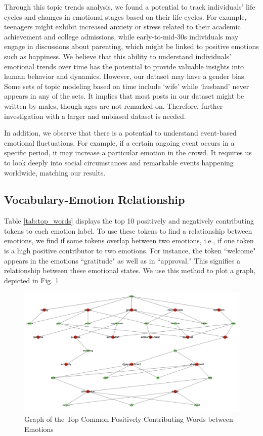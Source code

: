 \documentclass[conference,compsoc]{IEEEtran}
\begin{document}
Through this topic trends analysis, we found a potential to track individuals' life cycles and changes in emotional stages based on their life cycles. For example, teenagers might exhibit increased anxiety or stress related to their academic achievement and college admissions, while early-to-mid-30s individuals may engage in discussions about parenting, which might be linked to positive emotions such as happiness. We believe that this ability to understand individuals' emotional trends over time has the potential to provide valuable insights into human behavior and dynamics. However, our dataset may have a gender bias. Some sets of topic modeling based on time include `wife' while `husband' never appears in any of the sets. It implies that most posts in our dataset might be written by males, though ages are not remarked on. Therefore, further investigation with a larger and unbiased dataset is needed.

In addition, we observe that there is a potential to understand event-based emotional fluctuations. For example, if a certain ongoing event occurs in a specific period, it may increase a particular emotion in the crowd. It requires us to look deeply into social circumstances and remarkable events happening worldwide, matching our results. 


\subsection{Vocabulary-Emotion Relationship}

Table \ref{tab:top_words} displays the top 10 positively and negatively contributing tokens to each emotion label. To use these tokens to find a relationship between emotions, we find if some tokens overlap between two emotions, i.e., if one token is a high positive contributor to two emotions. For instance, the token ``welcome" appears in the emotions ``gratitude" as well as in ``approval." This signifies a relationship between these emotional states. We use this method to plot a graph, depicted in Fig. \ref{fig:vocab_emotion}

\begin{figure}[h!]
\includegraphics[width=\linewidth]{figs/vocab_emotion.png}
\caption{Graph of the Top Common Positively Contributing Words between Emotions}
\label{fig:vocab_emotion}
\end{figure}
\end{document}
